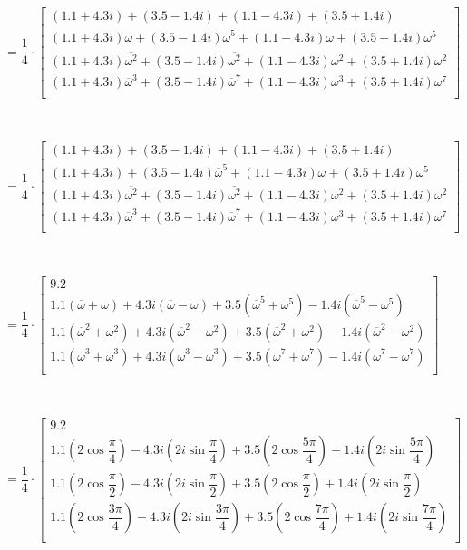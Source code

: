 $ $

$= \dfrac{1}{4} \cdot
\begin{bmatrix} 
(1.1 + 4.3i) + (3.5 - 1.4i) + (1.1 - 4.3i) + (3.5 + 1.4i)\\
(1.1 + 4.3i)\overline{\omega} + (3.5 - 1.4i)\overline{\omega}^5 + (1.1 - 4.3i)\omega+ (3.5 + 1.4i)\omega^5 \\
(1.1 + 4.3i)\overline{\omega^2} + (3.5 - 1.4i)\overline{\omega^2} + (1.1 - 4.3i)\omega^2+ (3.5 + 1.4i)\omega^2 \\
(1.1 + 4.3i)\overline{\omega}^3 + (3.5 - 1.4i)\overline{\omega}^7 + (1.1 - 4.3i)\omega^3 + (3.5 + 1.4i)\omega^7 \\
\end{bmatrix}$

$ $

$= \dfrac{1}{4} \cdot
\begin{bmatrix} 
(1.1 + 4.3i) + (3.5 - 1.4i) + (1.1 - 4.3i) + (3.5 + 1.4i)\\
(1.1 + 4.3i) + (3.5 - 1.4i)\overline{\omega}^5 + (1.1 - 4.3i)\omega+ (3.5 + 1.4i)\omega^5 \\
(1.1 + 4.3i)\overline{\omega^2} + (3.5 - 1.4i)\overline{\omega^2} + (1.1 - 4.3i)\omega^2+ (3.5 + 1.4i)\omega^2 \\
(1.1 + 4.3i)\overline{\omega}^3 + (3.5 - 1.4i)\overline{\omega}^7 + (1.1 - 4.3i)\omega^3 + (3.5 + 1.4i)\omega^7 \\
\end{bmatrix}$

$ $

$= \dfrac{1}{4} \cdot
\begin{bmatrix} 
9.2\\
1.1(\overline{\omega} + \omega) + 4.3i(\overline{\omega} - \omega) +
3.5(\overline{\omega}^5 + \omega^5) - 1.4i(\overline{\omega}^5 - \omega^5)\\
1.1(\overline{\omega}^2 + {\omega}^2) + 4.3i(\overline{\omega}^2 - {\omega}^2) +
3.5(\overline{\omega}^2 + {\omega}^2) - 1.4i(\overline{\omega}^2 - {\omega}^2)\\
1.1(\overline{\omega}^3 + \overline{\omega}^3) + 4.3i(\overline{\omega}^3 - \overline{\omega}^3) +
3.5(\overline{\omega}^7 + \overline{\omega}^7) - 1.4i(\overline{\omega}^7 - \overline{\omega}^7)\\
\end{bmatrix}$

$ $

$= \dfrac{1}{4} \cdot
\begin{bmatrix} 
9.2\\
1.1\left(2\cos\dfrac{\pi}{4}\right) - 4.3i\left(2i\sin\dfrac{\pi}{4}\right) + 3.5\left(2\cos\dfrac{5\pi}{4}\right) + 1.4i\left(2i\sin\dfrac{5\pi}{4}\right)\\
1.1\left(2\cos\dfrac{\pi}{2}\right) - 4.3i\left(2i\sin\dfrac{\pi}{2}\right) + 3.5\left(2\cos\dfrac{\pi}{2}\right) + 1.4i\left(2i\sin\dfrac{\pi}{2}\right)\\
1.1\left(2\cos\dfrac{3\pi}{4}\right) - 4.3i\left(2i\sin\dfrac{3\pi}{4}\right) + 3.5 \left(2\cos\dfrac{7\pi}{4}\right) + 1.4i\left(2i\sin\dfrac{7\pi}{4}\right)\\
\end{bmatrix}$

